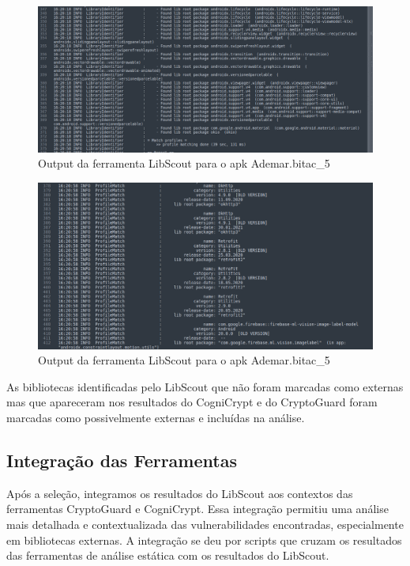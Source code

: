 \FloatBarrier

\begin{figure}[!ht]
  \centering
  \includegraphics[scale=0.4]{img/libscout_output.png}
  \caption{Output da ferramenta LibScout para o apk Ademar.bitac\_5}
  \label{img: libscout_output}
\end{figure}

\FloatBarrier

\begin{figure}[!ht]
  \centering
  \includegraphics[scale=0.4]{img/libscout_output2.png}
  \caption{Output da ferramenta LibScout para o apk Ademar.bitac\_5}
  \label{img: libscout_output2}
\end{figure}

\FloatBarrier

As bibliotecas identificadas pelo LibScout que não foram marcadas como externas mas que apareceram nos resultados do CogniCrypt e do CryptoGuard foram marcadas como possivelmente externas e incluídas na análise.

\subsection{Integração das Ferramentas} 

Após a seleção, integramos os resultados do LibScout aos contextos das ferramentas CryptoGuard e CogniCrypt. Essa integração permitiu uma análise mais detalhada e contextualizada das vulnerabilidades encontradas, especialmente em bibliotecas externas. A integração se deu por scripts que cruzam os resultados das ferramentas de análise estática com os resultados do LibScout.

